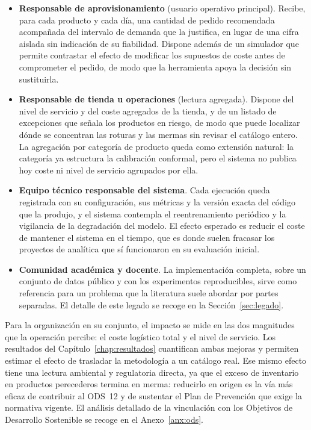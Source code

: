 \begin{itemize}
    \item \textbf{Responsable de aprovisionamiento} (usuario operativo principal). Recibe, para cada
    producto y cada día, una cantidad de pedido recomendada acompañada del intervalo de demanda que
    la justifica, en lugar de una cifra aislada sin indicación de su fiabilidad. Dispone además de un
    simulador que permite contrastar el efecto de modificar los supuestos de coste antes de
    comprometer el pedido, de modo que la herramienta apoya la decisión sin sustituirla.
    \item \textbf{Responsable de tienda u operaciones} (lectura agregada). Dispone del nivel de
    servicio y del coste agregados de la tienda, y de un listado de excepciones que señala los
    productos en riesgo, de modo que puede localizar dónde se concentran las roturas y las mermas
    sin revisar el catálogo entero. La agregación por categoría de producto queda como extensión
    natural: la categoría ya estructura la calibración conformal, pero el sistema no publica hoy
    coste ni nivel de servicio agrupados por ella.
    \item \textbf{Equipo técnico responsable del sistema}. Cada ejecución queda registrada con su
    configuración, sus métricas y la versión exacta del código que la produjo, y el sistema
    contempla el reentrenamiento periódico y la vigilancia de la degradación del modelo. El efecto
    esperado es reducir el coste de mantener el sistema en el tiempo, que es donde suelen fracasar
    los proyectos de analítica que sí funcionaron en su evaluación inicial.
    \item \textbf{Comunidad académica y docente}. La implementación completa, sobre un conjunto de
    datos público y con los experimentos reproducibles, sirve como referencia para un problema que
    la literatura suele abordar por partes separadas. El detalle de este legado se recoge en la
    Sección~\ref{sec:legado}.
\end{itemize}

Para la organización en su conjunto, el impacto se mide en las dos magnitudes que la operación
percibe: el coste logístico total y el nivel de servicio. Los resultados del
Capítulo~\ref{chap:resultados} cuantifican ambas mejoras y permiten estimar el efecto de trasladar
la metodología a un catálogo real. Ese mismo efecto tiene una lectura ambiental y regulatoria
directa, ya que el exceso de inventario en productos perecederos termina en merma: reducirlo en
origen es la vía más eficaz de contribuir al ODS~12 y de sustentar el Plan de Prevención que exige
la normativa vigente. El análisis detallado de la vinculación con los Objetivos de Desarrollo
Sostenible se recoge en el Anexo~\ref{anx:ods}.

